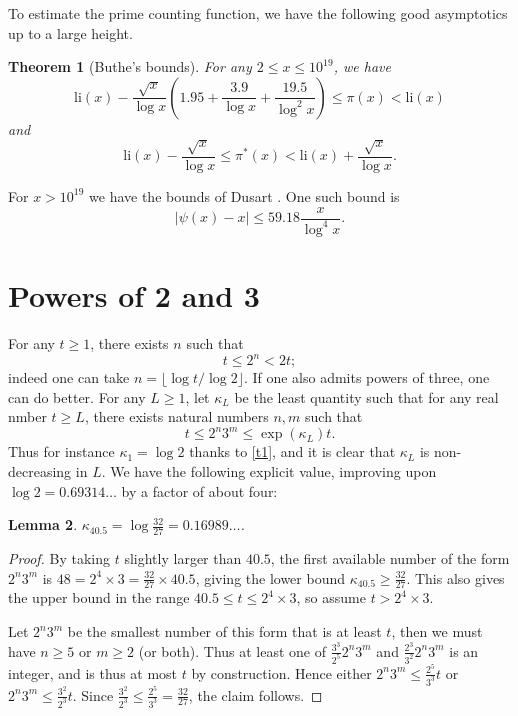 \documentclass[12pt,a4paper,reqno]{amsart}
\numberwithin{equation}{section}
\theoremstyle{plain}
\newtheorem{theorem}{Theorem}[section]
\newtheorem{lemma}[theorem]{Lemma}
\theoremstyle{definition}
\begin{document}
To estimate the prime counting function, we have the following good asymptotics up to a large height.

  \begin{theorem}[Buthe's bounds]\cite{buthe}  For any $2 \leq x \leq 10^{19}$, we have
  $$ \mathrm{li}(x) - \frac{\sqrt{x}}{\log x}\left(1.95 + \frac{3.9}{\log x} + \frac{19.5}{\log^2 x}\right) \leq \pi(x) < \mathrm{li}(x)$$
  and
  $$ \mathrm{li}(x) - \frac{\sqrt{x}}{\log x} \leq \pi^*(x) < \mathrm{li}(x) + \frac{\sqrt{x}}{{\log x}}.$$
  \end{theorem}
  
  For $x > 10^{19}$ we have the bounds of Dusart \cite{dusart}.  One such bound is
  $$ |\psi(x) - x| \leq 59.18 \frac{x}{\log^4 x}.$$

\section{Powers of 2 and 3}

For any $t \geq 1$, there exists $n$ such that
\begin{equation}\label{t1}
   t \leq 2^n < 2t;
\end{equation}
indeed one can take $n = \lfloor \log t / \log 2 \rfloor$.  If one also admits powers of three, one can do better.  For any $L \geq 1$, let $\kappa_L$ be the least quantity such that for any real nmber $t \geq L$, there exists natural numbers $n,m$ such that
$$ t \leq 2^n 3^m \leq \exp(\kappa_L) t.$$
Thus for instance $\kappa_1 = \log 2$ thanks to \eqref{t1}, and it is clear that $\kappa_L$ is non-decreasing in $L$.  We have the following explicit value, improving upon $\log 2 = 0.69314\dots$ by a factor of about four:

\begin{lemma}\label{lemcount-0}  $\kappa_{40.5} = \log \frac{32}{27} = 0.16989\dots$.
\end{lemma}

\begin{proof}  By taking $t$ slightly larger than $40.5$, the first available number of the form $2^n 3^m$ is $48 = 2^4 \times 3 = \frac{32}{27} \times 40.5$, giving the lower bound $\kappa_{40.5} \geq \frac{32}{27}$.  This also gives the upper bound in the range $40.5 \leq t \leq 2^4 \times 3$, so assume $t > 2^4 \times 3$.  
  
Let $2^n 3^m$ be the smallest number of this form that is at least $t$, then we must have $n \geq 5$ or $m \geq 2$ (or both).  Thus at least one of $\frac{3^3}{2^5} 2^n 3^m$ and $\frac{2^3}{3^2} 2^n 3^m$ is an integer, and is thus at most $t$ by construction.  Hence either $2^n 3^m \leq \frac{2^5}{3^3} t$ or $2^n 3^m \leq \frac{3^2}{2^3} t$.  Since $\frac{3^2}{2^3} \leq \frac{2^5}{3^3} = \frac{32}{27}$, the claim follows.
\end{proof}
\end{document}
